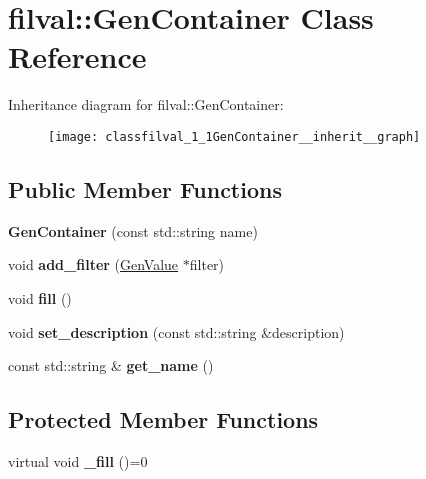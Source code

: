 \hypertarget{classfilval_1_1GenContainer}{}\section{filval\+:\+:Gen\+Container Class Reference}
\label{classfilval_1_1GenContainer}


Inheritance diagram for filval\+:\+:Gen\+Container\+:
\nopagebreak
\begin{figure}[H]
\begin{center}
\leavevmode
\texttt{[image: classfilval\_1\_1GenContainer\_\_inherit\_\_graph]}
\end{center}
\end{figure}
\subsection*{Public Member Functions}
\begin{DoxyCompactItemize}
\item 
\hypertarget{classfilval_1_1GenContainer_a3814e7bea5bff458a4a5d6d9be520963}{}\label{classfilval_1_1GenContainer_a3814e7bea5bff458a4a5d6d9be520963} 
{\bfseries Gen\+Container} (const std\+::string name)
\item 
\hypertarget{classfilval_1_1GenContainer_afa81b2d39e6bf30da18c898a9ebd404d}{}\label{classfilval_1_1GenContainer_afa81b2d39e6bf30da18c898a9ebd404d} 
void {\bfseries add\+\_\+filter} (\hyperlink{classfilval_1_1GenValue}{Gen\+Value} $\ast$filter)
\item 
\hypertarget{classfilval_1_1GenContainer_ab5b4842a407a34cfba73e6d55256c766}{}\label{classfilval_1_1GenContainer_ab5b4842a407a34cfba73e6d55256c766} 
void {\bfseries fill} ()
\item 
\hypertarget{classfilval_1_1GenContainer_a4a2e160bdfd8222e47e0964bcd7dbcfe}{}\label{classfilval_1_1GenContainer_a4a2e160bdfd8222e47e0964bcd7dbcfe} 
void {\bfseries set\+\_\+description} (const std\+::string \&description)
\item 
\hypertarget{classfilval_1_1GenContainer_a1d1a9ef9e5469b3081be1a2184811946}{}\label{classfilval_1_1GenContainer_a1d1a9ef9e5469b3081be1a2184811946} 
const std\+::string \& {\bfseries get\+\_\+name} ()
\end{DoxyCompactItemize}
\subsection*{Protected Member Functions}
\begin{DoxyCompactItemize}
\item 
\hypertarget{classfilval_1_1GenContainer_a3909b0377358d59a754785e2460d5912}{}\label{classfilval_1_1GenContainer_a3909b0377358d59a754785e2460d5912} 
virtual void {\bfseries \+\_\+fill} ()=0
\end{DoxyCompactItemize}
